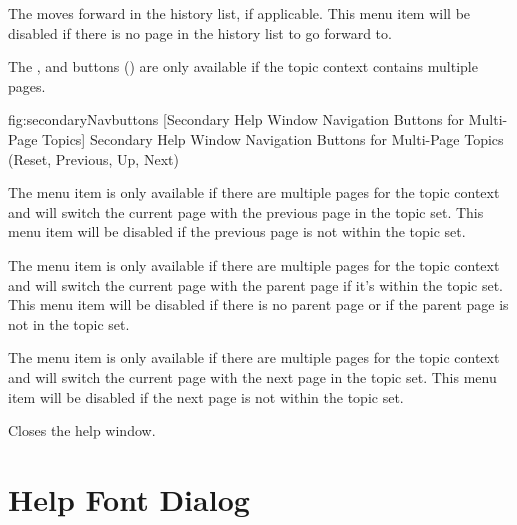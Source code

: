 The  moves forward in the
history list, if applicable. This menu item will be disabled if
there is no page in the history list to go forward to.

The , 
 and
 buttons
() are only available if the
topic context contains multiple pages.

\FloatFig
{fig:secondaryNavbuttons}
{%
}
[Secondary Help Window Navigation Buttons for Multi-Page Topics]
{Secondary Help Window Navigation Buttons for Multi-Page Topics
  (Reset, Previous, Up, Next)}


The  menu item is only
available if there are multiple pages for the topic context and will
switch the current page with the previous page in the topic set.
This menu item will be disabled if the previous page is not within the
topic set.


The  menu item is only
available if there are multiple pages for the topic context and will
switch the current page with the parent page if it's within the topic set.
This menu item will be disabled if there is no parent page or if the
parent page is not in the topic set.


The  menu item is only
available if there are multiple pages for the topic context and will
switch the current page with the next page in the topic set.
This menu item will be disabled if the next page is not within the
topic set.


Closes the help window.

\section{Help Font Dialog}
\label{sec:helpfontdialog}

